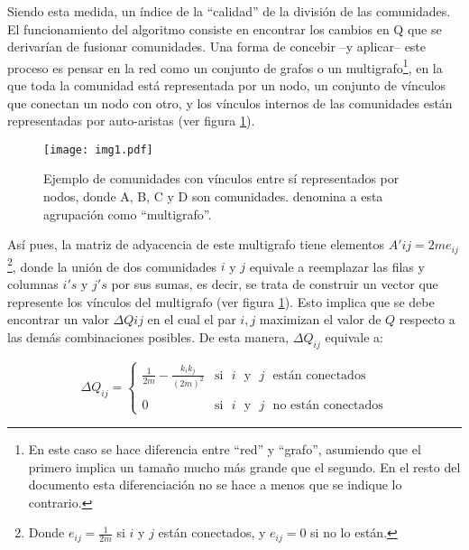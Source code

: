 \documentclass[12pt,letter]{article}
\begin{document}
\vspace{0.5cm}

Siendo esta medida, un índice de la ``calidad'' de la división de las comunidades. El funcionamiento del algoritmo consiste en encontrar los cambios en Q que se derivarían de fusionar comunidades. Una forma de concebir --y aplicar-- este proceso es pensar en la red como un conjunto de grafos o un multigrafo\footnote{En este caso se hace diferencia entre ``red'' y ``grafo'', asumiendo que el primero implica un tamaño mucho más grande que el segundo. En el resto del documento esta diferenciación no se hace a menos que se indique lo contrario.}, en la que toda la comunidad está representada por un nodo, un conjunto de vínculos que conectan un nodo con otro, y los vínculos internos de las comunidades están representadas por auto-aristas (ver figura \ref{Grup1}).

\begin{figure}[h!]
\centering
\texttt{[image: img1.pdf]}
\caption{\small{Ejemplo de comunidades con vínculos entre sí representados por nodos, donde A, B, C y D son comunidades. \cite{Clauset} denomina a esta agrupación como ``multigrafo''.}} \label{Grup1}
\end{figure}

\vspace{0.5cm}

Así pues, la matriz de adyacencia de este multigrafo tiene elementos $A'ij = 2me_{ij}$\footnote{Donde $e_{ij}=\frac{1}{2m}$ si $i$ y $j$ están conectados, y $e_{ij}=0$ si no lo están.}, donde la unión de dos comunidades $i$ y $j$ equivale a reemplazar las filas y columnas $i's$ y $j's$ por sus sumas, es decir, se trata de construir un vector que represente los vínculos del multigrafo (ver figura \ref{Grup1}). Esto implica que se debe encontrar un valor $\Delta Q{ij}$ en el cual el par $i, j$ maximizan el valor de $Q$ respecto a las demás combinaciones posibles. De esta manera, $\Delta Q_{ij}$ equivale a:

\begin{equation}
\Delta Q_{ij}=\left\{ \begin{array}{lc}
                         \frac{1}{2m}-\frac{k_ik_j}{(2m)^2} & \mbox{si}\,\,\,\, i\,\,\,\, \mbox{y}\,\,\,\, j\,\,\,\, \mbox{están conectados}\\
                          & \\
                          0 & \mbox{si}\,\,\,\, i \,\,\,\,\mbox{y}\,\,\,\, j\,\,\,\, \mbox{no } \mbox{están conectados}
                         \end{array} \right.
\end{equation}
\end{document}
